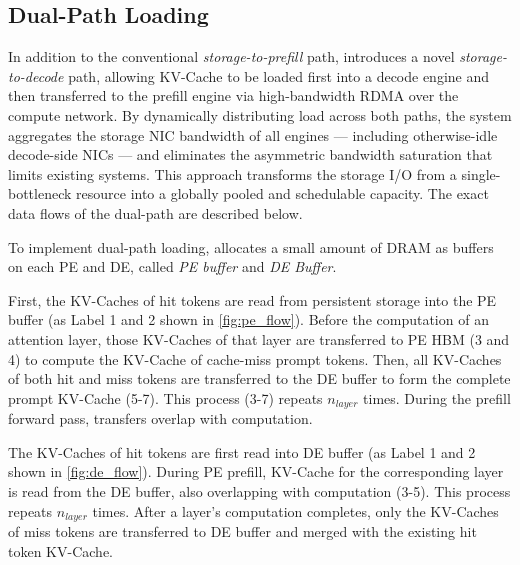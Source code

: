 \subsection{Dual-Path Loading}
\label{sec:dual-path-loading}

In addition to the conventional \emph{storage-to-prefill} path, \sysname introduces a novel \emph{storage-to-decode} path, allowing KV-Cache to be loaded first into a decode engine and then transferred to the prefill engine via high-bandwidth RDMA over the compute network. 
By dynamically distributing load across both paths, the system aggregates the storage NIC bandwidth of all engines --- including otherwise-idle decode-side NICs --- and eliminates the asymmetric bandwidth saturation that limits existing systems. This approach transforms the storage I/O from a single-bottleneck resource into a globally pooled and schedulable capacity. %
The exact data flows of the dual-path are described below.

To implement dual-path loading, \sysname allocates a small amount of DRAM as buffers on each PE and DE, called \emph{PE buffer} and \emph{DE Buffer}.

First, the KV-Caches of hit tokens are read from persistent storage into the PE buffer (as Label 1 and 2 shown in \autoref{fig:pe_flow}). 
Before the computation of an attention layer, those KV-Caches of that layer are transferred to PE HBM (3 and 4) to compute the KV-Cache of cache-miss prompt tokens.
Then, all KV-Caches of both hit and miss tokens are transferred to the DE buffer to form the complete prompt KV-Cache (5-7). This process (3-7) repeats $n_{layer}$ times.
During the prefill forward pass, transfers overlap with computation.

 The KV-Caches of hit tokens are first read into DE buffer (as Label 1 and 2 shown in \autoref{fig:de_flow}).
During PE prefill, KV-Cache for the corresponding layer is read from the DE buffer, also overlapping with computation (3-5). This process repeats $n_{layer}$ times.
After a layer's computation completes, only the KV-Caches of miss tokens are transferred to DE buffer and merged with the existing hit token KV-Cache.

